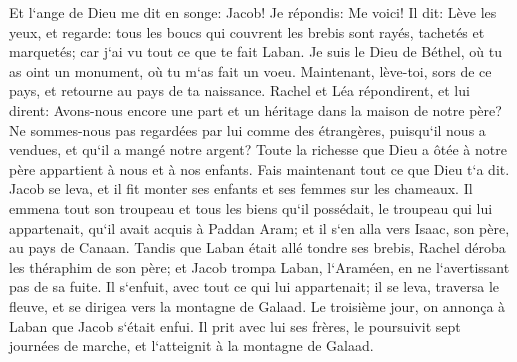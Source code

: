 \verse Et l`ange de Dieu me dit en songe: Jacob! Je répondis: Me voici! 
\verse Il dit: Lève les yeux, et regarde: tous les boucs qui couvrent les brebis sont rayés, tachetés et marquetés; car j`ai vu tout ce que te fait Laban. 
\verse Je suis le Dieu de Béthel, où tu as oint un monument, où tu m`as fait un voeu. Maintenant, lève-toi, sors de ce pays, et retourne au pays de ta naissance. 
\verse Rachel et Léa répondirent, et lui dirent: Avons-nous encore une part et un héritage dans la maison de notre père? 
\verse Ne sommes-nous pas regardées par lui comme des étrangères, puisqu`il nous a vendues, et qu`il a mangé notre argent? 
\verse Toute la richesse que Dieu a ôtée à notre père appartient à nous et à nos enfants. Fais maintenant tout ce que Dieu t`a dit. 
\verse Jacob se leva, et il fit monter ses enfants et ses femmes sur les chameaux. 
\verse Il emmena tout son troupeau et tous les biens qu`il possédait, le troupeau qui lui appartenait, qu`il avait acquis à Paddan Aram; et il s`en alla vers Isaac, son père, au pays de Canaan. 
\verse Tandis que Laban était allé tondre ses brebis, Rachel déroba les théraphim de son père; 
\verse et Jacob trompa Laban, l`Araméen, en ne l`avertissant pas de sa fuite. 
\verse Il s`enfuit, avec tout ce qui lui appartenait; il se leva, traversa le fleuve, et se dirigea vers la montagne de Galaad. 
\verse Le troisième jour, on annonça à Laban que Jacob s`était enfui. 
\verse Il prit avec lui ses frères, le poursuivit sept journées de marche, et l`atteignit à la montagne de Galaad. 
